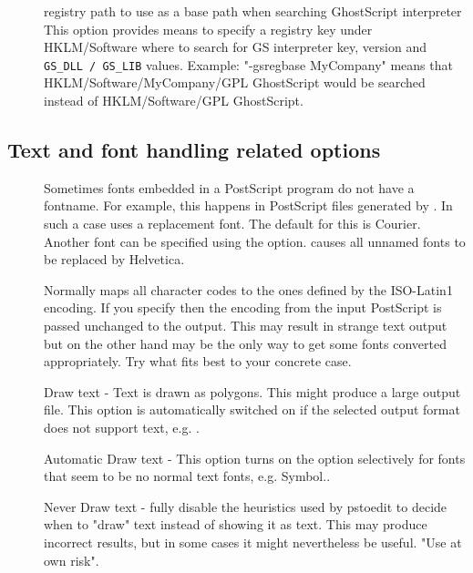 \documentclass[english,a4paper]{article}
\begin{document}
\begin{description}
\item[] 
registry path to use as a base path when searching GhostScript interpreter  
This option provides means to specify a registry key under HKLM/Software where to search for GS interpreter key, version and \verb+GS_DLL / GS_LIB+ values. Example: "-gsregbase MyCompany" means  that HKLM/Software/MyCompany/GPL GhostScript would be searched instead of HKLM/Software/GPL GhostScript. 


\end{description}
\subsection{Text and font handling related options}
\begin{description}
\item[] 
 Sometimes fonts embedded in a PostScript program do not have a fontname. For example, this happens in PostScript files generated by . In such a case  uses a replacement font. The default for this is Courier. Another font can be specified using the  option.  causes all unnamed fonts to be replaced by Helvetica. 


\item[] 
Normally  maps all character codes to the ones defined by the ISO-Latin1 encoding. If you specify  then the encoding from the input PostScript is passed unchanged to the output. This may result in strange text output but on the other hand may be the only way to get some fonts converted appropriately. Try what fits best to your concrete case. 


\item[] 
Draw text - Text is drawn as polygons. This might produce a large output file. This option is automatically switched on if the selected output format does not support text, e.g. .


\item[] 
Automatic Draw text - This option turns on the  option selectively for fonts that seem to be no normal text fonts, e.g. Symbol..


\item[] 
Never Draw text -  fully disable the heuristics used by pstoedit to decide when to "draw" text instead of showing it as text. This may produce incorrect results, but in some cases it might nevertheless be useful. "Use at own risk". 



\end{description}
\end{document}
